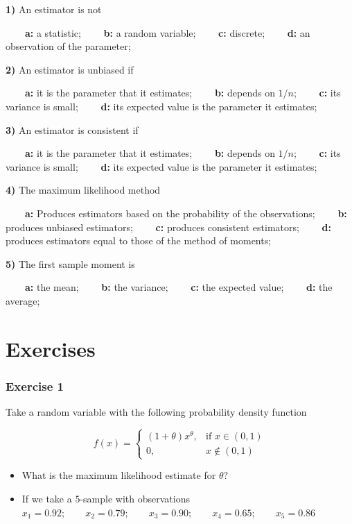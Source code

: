 \documentclass[
]{book}
\begin{document}
\textbf{1)} An estimator is not

\textbf{\(\qquad\)a:} a statistic;
\textbf{\(\qquad\)b:} a random variable;
\textbf{\(\qquad\)c:} discrete;
\textbf{\(\qquad\)d:} an observation of the parameter;

\textbf{2)} An estimator is unbiased if

\textbf{\(\qquad\)a:} it is the parameter that it estimates;
\textbf{\(\qquad\)b:} depends on \(1/n\);
\textbf{\(\qquad\)c:} its variance is small;
\textbf{\(\qquad\)d:} its expected value is the parameter it estimates;

\textbf{3)} An estimator is consistent if

\textbf{\(\qquad\)a:} it is the parameter that it estimates;
\textbf{\(\qquad\)b:} depends on \(1/n\);
\textbf{\(\qquad\)c:} its variance is small;
\textbf{\(\qquad\)d:} its expected value is the parameter it estimates;

\textbf{4)} The maximum likelihood method

\textbf{\(\qquad\)a:} Produces estimators based on the probability of the observations;
\textbf{\(\qquad\)b:} produces unbiased estimators;
\textbf{\(\qquad\)c:} produces consistent estimators;
\textbf{\(\qquad\)d:} produces estimators equal to those of the method of moments;

\textbf{5)} The first sample moment is

\textbf{\(\qquad\)a:} the mean;
\textbf{\(\qquad\)b:} the variance;
\textbf{\(\qquad\)c:} the expected value;
\textbf{\(\qquad\)d:} the average;

\hypertarget{exercises-10}{%
\section{Exercises}\label{exercises-10}}

\hypertarget{exercise-1-9}{%
\subsubsection{Exercise 1}\label{exercise-1-9}}

Take a random variable with the following probability density function

\[
f(x)=
\begin{cases}
    (1+\theta)x^\theta,& \text{if } x\in (0,1)\\
    0,&  x\notin (0,1)
\end{cases}
\]

\begin{itemize}
\item
  What is the maximum likelihood estimate for \(\theta\)?
\item
  If we take a \(5\)-sample with observations
  \(x_1 = 0.92; \qquad x_2 = 0.79; \qquad x_3 = 0.90; \qquad x_4 = 0.65; \qquad x_5 = 0.86\)
\end{itemize}
\end{document}
